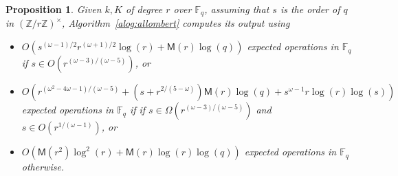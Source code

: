 \documentclass{mcom-l}
\theoremstyle{plain}
\newtheorem{proposition}[theorem]{Proposition}
\theoremstyle{definition}
\newcommand{\Z}{\ensuremath{\mathbb{Z}}}
\newcommand{\F}{\ensuremath{\mathbb{F}}}
\newcommand{\MM}{\ensuremath{\mathsf{M}}}
\begin{document}
\begin{proposition}
  \label{proposition:XiDelta-updated}
  Given $k,K$ of degree $r$ over $\F_q$, assuming that $s$ is the
  order of $q$ in $(\Z/r\Z)^\times$,   Algorithm~\ref{alog:allombert} 
 computes its output using 
  \begin{itemize}
  \item $O(s^{(\omega-1)/2}r^{(\omega+1)/2}\log(r)+\MM(r)\log(q))$
    expected operations in $\F_q$ if $s \in O(r^{(\omega-3)/(\omega-5)})$, or
  \item
    $O(
 r^{(\omega^2-4\omega-1)/(\omega-5)}+(s+r^{2/(5-\omega)})\MM(r)\log(q)
+s^{\omega-1}r\log(r)\log(s))$
    expected operations in $\F_q$ if if $s \in \Omega(r^{(\omega-3)/(\omega-5)})$
    and $s \in O(r^{1/(\omega-1)})$, or
  \item $O(\MM(r^2)\log^2(r) + \MM(r)\log(r)\log(q))$ expected operations in
    $\F_q$ otherwise.
  \end{itemize}
\end{proposition}
\end{document}
